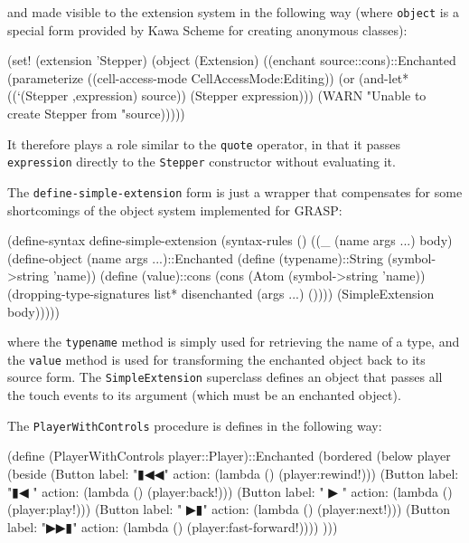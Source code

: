 \documentclass[acmsmall]{acmart}
\newenvironment{Snippet}{\Verbatim[samepage=true]}{\endVerbatim}
\begin{document}
and made visible to the extension system in the following way (where
\texttt{object} is a special form provided by Kawa Scheme for creating
anonymous classes):

\begin{Snippet}
(set! (extension 'Stepper)
      (object (Extension)
	((enchant source::cons)::Enchanted
	 (parameterize ((cell-access-mode CellAccessMode:Editing))
	   (or (and-let* ((`(Stepper ,expression) source))
		 (Stepper expression)))
	     (WARN "Unable to create Stepper from "source)))))
\end{Snippet}

It therefore plays a role similar to the \texttt{quote} operator, in that
it passes \texttt{expression} directly to the \texttt{Stepper} constructor
without evaluating it.

The \texttt{define-simple-extension} form is just a wrapper that compensates
for some shortcomings of the object system implemented for GRASP:

\begin{Snippet}
(define-syntax define-simple-extension
  (syntax-rules ()
    ((_ (name args ...) body)
     (define-object (name args ...)::Enchanted 
       (define (typename)::String
	 (symbol->string 'name))
\end{Snippet}
\begin{Snippet}
       (define (value)::cons
	 (cons (Atom (symbol->string 'name))
	       (dropping-type-signatures list*
					 disenchanted
					 (args ...)
					 ())))
       (SimpleExtension body)))))
\end{Snippet}

where the \texttt{typename} method is simply used for retrieving the
name of a type, and the \texttt{value} method is used for transforming
the enchanted object back to its source form. The
\texttt{SimpleExtension} superclass defines an object that passes all
the touch events to its argument (which must be an enchanted object).

The \texttt{PlayerWithControls} procedure is defines in the following way:

\begin{Snippet}
(define (PlayerWithControls player::Player)::Enchanted
  (bordered
   (below
    player
    (beside
      (Button label: "▮◀◀" action: (lambda () (player:rewind!)))
      (Button label: "▮◀ " action: (lambda () (player:back!)))
      (Button label: " ▶ " action: (lambda () (player:play!)))
      (Button label: " ▶▮" action: (lambda () (player:next!)))
      (Button label: "▶▶▮" action: (lambda () (player:fast-forward!))))
    )))
\end{Snippet}
\end{document}
